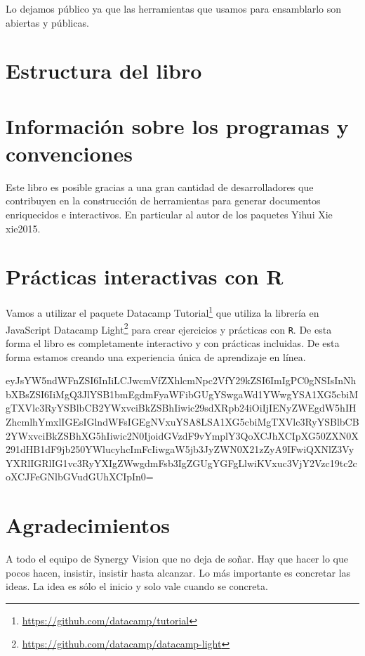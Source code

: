 \documentclass[12pt,]{krantz}
\renewcommand{\href}[2]{#2\footnote{\url{#1}}}
\theoremstyle{definition}
\theoremstyle{definition}
\theoremstyle{definition}
\theoremstyle{remark}
\begin{document}
Lo dejamos público ya que las herramientas que usamos para ensamblarlo
son abiertas y públicas.

\section*{Estructura del libro}\label{estructura-del-libro}


\section*{Información sobre los programas y
convenciones}\label{informacion-sobre-los-programas-y-convenciones}

Este libro es posible gracias a una gran cantidad de desarrolladores que
contribuyen en la construcción de herramientas para generar documentos
enriquecidos e interactivos. En particular al autor de los paquetes
Yihui Xie xie2015.

\section*{Prácticas interactivas con
R}\label{practicas-interactivas-con-r}


Vamos a utilizar el paquete
\href{https://github.com/datacamp/tutorial}{Datacamp Tutorial} que
utiliza la librería en JavaScript
\href{https://github.com/datacamp/datacamp-light}{Datacamp Light} para
crear ejercicios y prácticas con \texttt{R}. De esta forma el libro es
completamente interactivo y con prácticas incluidas. De esta forma
estamos creando una experiencia única de aprendizaje en línea.

eyJsYW5ndWFnZSI6InIiLCJwcmVfZXhlcmNpc2VfY29kZSI6ImIgPC0gNSIsInNhbXBsZSI6IiMgQ3JlYSB1bmEgdmFyaWFibGUgYSwgaWd1YWwgYSA1XG5cbiMgTXVlc3RyYSBlbCB2YWxvciBkZSBhIiwic29sdXRpb24iOiIjIENyZWEgdW5hIHZhcmlhYmxlIGEsIGlndWFsIGEgNVxuYSA8LSA1XG5cbiMgTXVlc3RyYSBlbCB2YWxvciBkZSBhXG5hIiwic2N0IjoidGVzdF9vYmplY3QoXCJhXCIpXG50ZXN0X291dHB1dF9jb250YWlucyhcImFcIiwgaW5jb3JyZWN0X21zZyA9IFwiQXNlZ3VyYXRlIGRlIG1vc3RyYXIgZWwgdmFsb3IgZGUgYGFgLlwiKVxuc3VjY2Vzc19tc2coXCJFeGNlbGVudGUhXCIpIn0=

\section*{Agradecimientos}\label{agradecimientos}


A todo el equipo de Synergy Vision que no deja de soñar. Hay que hacer
lo que pocos hacen, insistir, insistir hasta alcanzar. Lo más importante
es concretar las ideas. La idea es sólo el inicio y solo vale cuando se
concreta.
\end{document}
